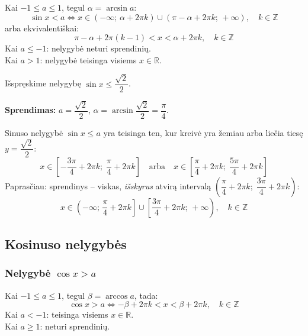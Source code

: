 \begin{tcolorbox}[colback=green!5!white, colframe=green!60!black, title=Formulė -- $\sin x < a$]
Kai $-1 \leq a \leq 1$, tegul $\alpha = \arcsin a$:
\[
\sin x < a \iff x \in (-\infty;\, \alpha + 2\pi k) \cup (\pi - \alpha + 2\pi k;\, +\infty), \quad k \in \mathbb{Z}
\]
arba ekvivalentiškai:
\[
\pi - \alpha + 2\pi(k-1) < x < \alpha + 2\pi k, \quad k \in \mathbb{Z}
\]
Kai $a \leq -1$: nelygybė neturi sprendinių.\\
Kai $a > 1$: nelygybė teisinga visiems $x \in \mathbb{R}$.
\end{tcolorbox}

\begin{example}
Išspręskime nelygybę $\sin x \leq \dfrac{\sqrt{2}}{2}$.

\textbf{Sprendimas:} $a = \dfrac{\sqrt{2}}{2}$, $\alpha = \arcsin \dfrac{\sqrt{2}}{2} = \dfrac{\pi}{4}$.

Sinuso nelygybė $\sin x \leq a$ yra teisinga ten, kur kreivė yra žemiau arba liečia tiesę $y = \dfrac{\sqrt{2}}{2}$:
\[
x \in \left[-\frac{3\pi}{4} + 2\pi k;\; \frac{\pi}{4} + 2\pi k\right]
\quad\text{arba}\quad x \in \left[\frac{\pi}{4}+2\pi k;\; \frac{5\pi}{4}+2\pi k\right]
\]
Paprasčiau: sprendinys -- viskas, \emph{išskyrus} atvirą intervalą $\left(\dfrac{\pi}{4}+2\pi k;\; \dfrac{3\pi}{4}+2\pi k\right)$:
\[
x \in \left(-\infty;\, \frac{\pi}{4}+2\pi k\right] \cup \left[\frac{3\pi}{4}+2\pi k;\, +\infty\right), \quad k \in \mathbb{Z}
\]
\end{example}

\subsection{Kosinuso nelygybės}

\subsubsection*{Nelygybė \texorpdfstring{$\cos x > a$}{cos x > a}}

\begin{tcolorbox}[colback=red!5!white, colframe=red!60!black, title=Formulė -- $\cos x > a$]
Kai $-1 \leq a \leq 1$, tegul $\beta = \arccos a$, tada:
\[
\cos x > a \iff -\beta + 2\pi k < x < \beta + 2\pi k, \quad k \in \mathbb{Z}
\]
Kai $a < -1$: teisinga visiems $x \in \mathbb{R}$.\\
Kai $a \geq 1$: neturi sprendinių.
\end{tcolorbox}

